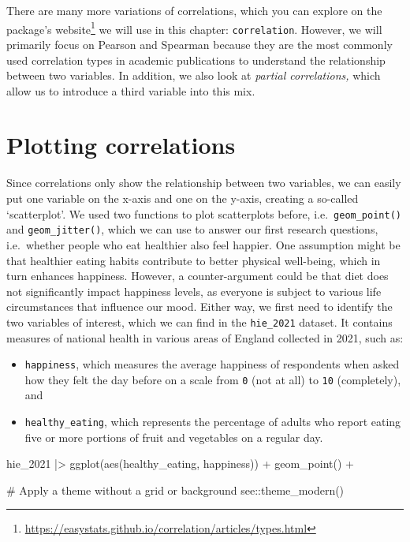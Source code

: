 \documentclass[
  letterpaper,
]{krantz}
\makeatletter
\newenvironment{Shaded}{\begin{snugshade}}{\end{snugshade}}
\newcommand{\CommentTok}[1]{\textcolor[rgb]{0.37,0.37,0.37}{#1}}
\newcommand{\FunctionTok}[1]{\textcolor[rgb]{0.28,0.35,0.67}{#1}}
\newcommand{\NormalTok}[1]{\textcolor[rgb]{0.00,0.23,0.31}{#1}}
\newcommand{\SpecialCharTok}[1]{\textcolor[rgb]{0.37,0.37,0.37}{#1}}
\renewcommand{\href}[2]{#2\footnote{\url{#1}}}
\newenvironment{kframe}{%
\medskip{}
\setlength{\fboxsep}{.8em}
 \def\at@end@of@kframe{}%
 \ifinner\ifhmode%
  \def\at@end@of@kframe{\end{minipage}}%
  \begin{minipage}{\columnwidth}%
 \fi\fi%
 \def\FrameCommand##1{\hskip\@totalleftmargin \hskip-\fboxsep
 \colorbox{shadecolor}{##1}\hskip-\fboxsep
     \hskip-\linewidth \hskip-\@totalleftmargin \hskip\columnwidth}%
 \MakeFramed {\advance\hsize-\width
   \@totalleftmargin\z@ \linewidth\hsize
   \@setminipage}}%
 {\par\unskip\endMakeFramed%
 \at@end@of@kframe}
\renewenvironment{Shaded}{\begin{kframe}}{\end{kframe}}
\makeatother
\begin{document}
\endgroup

There are many more variations of correlations, which you can explore on
the
\href{https://easystats.github.io/correlation/articles/types.html}{package's
website} we will use in this chapter: \texttt{correlation}. However, we
will primarily focus on Pearson and Spearman because they are the most
commonly used correlation types in academic publications to understand
the relationship between two variables. In addition, we also look at
\emph{partial correlations,} which allow us to introduce a third
variable into this mix.

\section{Plotting correlations}\label{sec-plotting-correlations}

Since correlations only show the relationship between two variables, we
can easily put one variable on the x-axis and one on the y-axis,
creating a so-called `scatterplot'. We used two functions to plot
scatterplots before, i.e.~\texttt{geom\_point()} and
\texttt{geom\_jitter()}, which we can use to answer our first research
questions, i.e.~whether people who eat healthier also feel happier. One
assumption might be that healthier eating habits contribute to better
physical well-being, which in turn enhances happiness. However, a
counter-argument could be that diet does not significantly impact
happiness levels, as everyone is subject to various life circumstances
that influence our mood. Either way, we first need to identify the two
variables of interest, which we can find in the \texttt{hie\_2021}
dataset. It contains measures of national health in various areas of
England collected in 2021, such as:

\begin{itemize}
\item
  \texttt{happiness}, which measures the average happiness of
  respondents when asked how they felt the day before on a scale from
  \texttt{0} (not at all) to \texttt{10} (completely), and
\item
  \texttt{healthy\_eating}, which represents the percentage of adults
  who report eating five or more portions of fruit and vegetables on a
  regular day.
\end{itemize}

\begin{Shaded}
\begin{Highlighting}[]
\NormalTok{hie\_2021 }\SpecialCharTok{|\textgreater{}}
  \FunctionTok{ggplot}\NormalTok{(}\FunctionTok{aes}\NormalTok{(healthy\_eating, happiness)) }\SpecialCharTok{+}
  \FunctionTok{geom\_point}\NormalTok{() }\SpecialCharTok{+}
  
  \CommentTok{\# Apply a theme without a grid or background}
\NormalTok{  see}\SpecialCharTok{::}\FunctionTok{theme\_modern}\NormalTok{()}
\end{Highlighting}
\end{Shaded}
\end{document}
